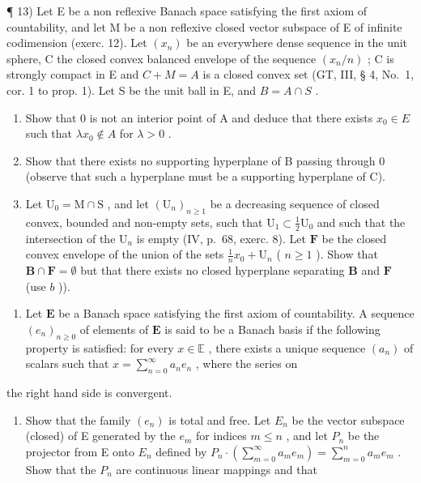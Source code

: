 ¶ 13) Let E be a non reflexive Banach space satisfying the first axiom of countability, and let M be a non reflexive closed vector subspace of E of infinite codimension (exerc. 12). Let \((x_{n})\) be an everywhere dense sequence in the unit sphere, C the closed convex balanced envelope of the sequence \((x_{n}/n)\) ; C is strongly compact in E and \(C + M = A\) is a closed convex set (GT, III, § 4, No.~1, cor. 1 to prop. 1). Let S be the unit ball in E, and \(B = A \cap S\) .

\begin{enumerate}
\def\labelenumi{\alph{enumi})}
\item
  Show that 0 is not an interior point of A and deduce that there exists \(x_0 \in E\) such that \(\lambda x_0 \notin A\) for \(\lambda > 0\) .
\item
  Show that there exists no supporting hyperplane of B passing through 0 (observe that such a hyperplane must be a supporting hyperplane of C).
\item
  Let \(\mathrm{U}_0 = \mathrm{M} \cap \mathrm{S}\) , and let \((\mathrm{U}_n)_{n \geqslant 1}\) be a decreasing sequence of closed convex, bounded and non-empty sets, such that \(\mathrm{U}_1 \subset \frac{1}{2}\mathrm{U}_0\) and such that the intersection of the \(\mathrm{U}_n\) is empty (IV, p.~68, exerc. 8). Let \(\mathbf{F}\) be the closed convex envelope of the union of the sets \(\frac{1}{n} x_0 + \mathrm{U}_n\) ( \(n \geqslant 1\) ). Show that \(\mathbf{B} \cap \mathbf{F} = \emptyset\) but that there exists no closed hyperplane separating \(\mathbf{B}\) and \(\mathbf{F}\) (use \(b\) )).
\end{enumerate}

\begin{enumerate}
\def\labelenumi{\arabic{enumi})}
\setcounter{enumi}{13}
\tightlist
\item
  Let \(\mathbf{E}\) be a Banach space satisfying the first axiom of countability. A sequence \((e_n)_{n\geqslant 0}\) of elements of \(\mathbf{E}\) is said to be a Banach basis if the following property is satisfied: for every \(x\in \mathbb{E}\) , there exists a unique sequence \((a_{n})\) of scalars such that \(x = \sum_{n = 0}^{\infty}a_{n}e_{n}\) , where the series on
\end{enumerate}

the right hand side is convergent.

\begin{enumerate}
\def\labelenumi{\alph{enumi})}
\tightlist
\item
  Show that the family \((e_n)\) is total and free. Let \(E_n\) be the vector subspace (closed) of E generated by the \(e_m\) for indices \(m \leqslant n\) , and let \(P_n\) be the projector from E onto \(E_n\) defined by \(P_n \cdot (\sum_{m=0}^{\infty} a_m e_m) = \sum_{m=0}^{n} a_m e_m\) . Show that the \(P_n\) are continuous linear mappings and that
\end{enumerate}

